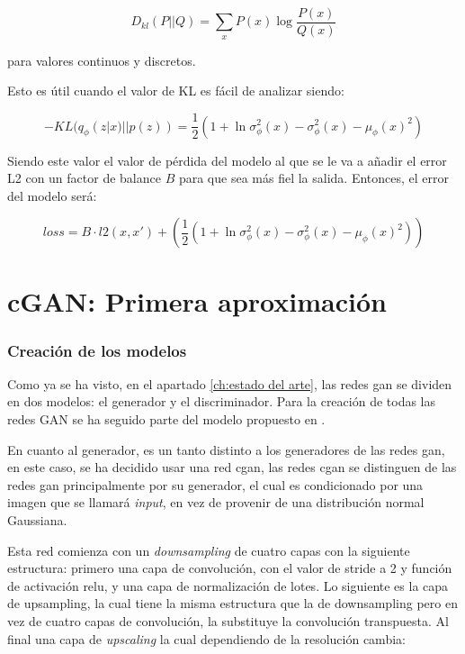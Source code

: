 \begin{equation}
	D_{kl}(P||Q)=\sum_xP(x)\log \frac {P(x)} {Q(x)}
\end{equation}

para valores continuos y discretos.

Esto es útil cuando el valor de KL es fácil de analizar siendo: 

\begin{equation}
	-KL(q_\phi(z|x)||p(z))= \frac {1}{2}(1 + \ln\sigma_\phi^2(x) - \sigma_\phi^2(x) - \mu_\phi(x)^2)
\end{equation}

Siendo este valor el valor de pérdida del modelo al que se le va a añadir el error L2 con un factor de balance \(B\) para que sea más fiel la salida. Entonces, el error del modelo será: 

\begin{equation}
	loss = B \cdot l2(x, x') + \left(\frac {1}{2}(1 + \ln\sigma_\phi^2(x) - \sigma_\phi^2(x) - \mu_\phi(x)^2)\right)
\end{equation}


\section{cGAN: Primera aproximación}

\subsubsection{Creación de los modelos}

Como ya se ha visto, en el apartado \ref{ch:estado del arte},  las redes \gls{gan} se dividen en dos modelos: el generador y el discriminador. Para la creación de todas las redes GAN se ha seguido parte del modelo propuesto en \cite{pix2pix}.

En cuanto al generador, es un tanto distinto a los generadores de las redes \gls{gan}, en este caso, se ha decidido usar una red \acrfull{cgan}, las redes \gls{cgan} se distinguen de las redes \gls{gan} principalmente por su generador, el cual es condicionado por una imagen que se llamará \textit{input}, en vez de provenir de una distribución normal Gaussiana.

Esta red comienza con un \textit{downsampling} de cuatro capas con la siguiente estructura: primero una capa de convolución, con el valor de stride a 2 y función de activación relu, y una capa de normalización de lotes. Lo siguiente es la capa de upsampling, la cual tiene la misma estructura que la de downsampling pero en vez de cuatro capas de convolución, la substituye la convolución transpuesta. Al final una capa de \textit{upscaling} la cual dependiendo de la resolución cambia:

